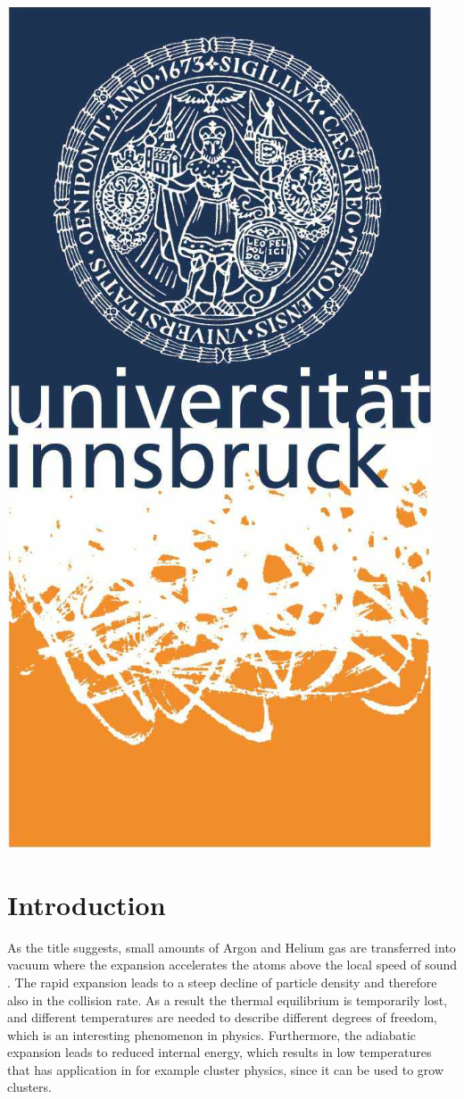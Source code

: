 \documentclass[a4paper,10pt]{article}
\begin{document}
\begin{titlepage}
	\begin{center}
	\includegraphics[scale=0.4]{img/uibk}
	\end{center}

\end{titlepage}

\section{Introduction}
As the title suggests, small amounts of Argon and Helium gas are transferred into vacuum where the expansion accelerates the atoms above the local speed of sound \cite{illinois}. The rapid expansion leads to a steep decline of particle density and therefore also in the collision rate. As a result the thermal equilibrium is temporarily lost, and different temperatures are needed to describe different degrees of freedom, which is an interesting phenomenon in physics. Furthermore, the adiabatic expansion leads to reduced internal energy, which results in low temperatures that has application in for example cluster physics, since it can be used to grow clusters.
\end{document}
